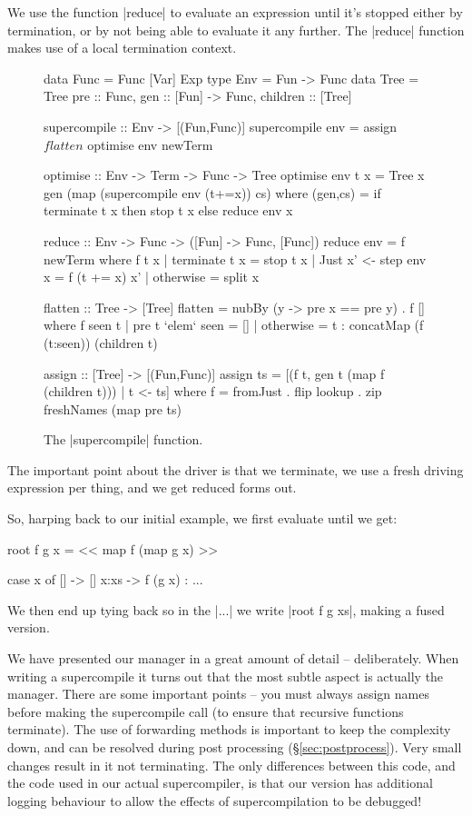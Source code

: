 \documentclass{sigplanconf}
\begin{document}
We use the function |reduce| to evaluate an expression until it's stopped either by termination, or by not being able to evaluate it any further. The |reduce| function makes use of a local termination context.

\begin{figure}
\begin{code}
data Func = Func [Var] Exp
type Env = Fun -> Func
data Tree = Tree {pre :: Func, gen :: [Fun] -> Func, children :: [Tree]}

supercompile :: Env -> [(Fun,Func)]
supercompile env = assign $ flatten $ optimise env newTerm

optimise :: Env -> Term -> Func -> Tree
optimise env t x = Tree x gen (map (supercompile env (t+=x)) cs)
    where (gen,cs) = if terminate t x then stop t x else reduce env x

reduce :: Env -> Func -> ([Fun] -> Func, [Func])
reduce env = f newTerm
    where f t x | terminate t x = stop t x
                | Just x' <- step env x = f (t += x) x'
                | otherwise = split x

flatten :: Tree -> [Tree]
flatten = nubBy (\x y -> pre x == pre y) . f []
    where f seen t  | pre t `elem` seen = []
                    | otherwise = t : concatMap (f (t:seen)) (children t)

assign :: [Tree] -> [(Fun,Func)]
assign ts = [(f t, gen t (map f (children t))) |  t <- ts]
    where f = fromJust . flip lookup . zip freshNames (map pre ts)
\end{code}
\caption{The |supercompile| function.}
\label{fig:supercompile}
\end{figure}


The important point about the driver is that we terminate, we use a fresh driving expression per thing, and we get reduced forms out.

So, harping back to our initial example, we first evaluate until we get:

\begin{code}
root f g x = << map f (map g x) >>
\end{code}


\begin{code}
case x of
   [] -> []
   x:xs -> f (g x) : ...
\end{code}

We then end up tying back so in the |...| we write |root f g xs|, making a fused version.

We have presented our manager in a great amount of detail -- deliberately. When writing a supercompile it turns out that the most subtle aspect is actually the manager. There are some important points -- you must always assign names before making the supercompile call (to ensure that recursive functions terminate). The use of forwarding methods is important to keep the complexity down, and can be resolved during post processing (\S\ref{sec:postprocess}). Very small changes result in it not terminating. The only differences between this code, and the code used in our actual supercompiler, is that our version has additional logging behaviour to allow the effects of supercompilation to be debugged!
\end{document}
